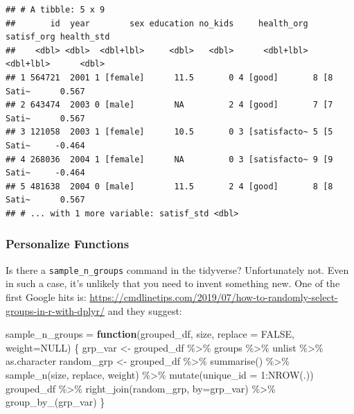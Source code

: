 \documentclass[
]{book}
\newenvironment{Shaded}{\begin{snugshade}}{\end{snugshade}}
\newcommand{\AttributeTok}[1]{\textcolor[rgb]{0.77,0.63,0.00}{#1}}
\newcommand{\ConstantTok}[1]{\textcolor[rgb]{0.00,0.00,0.00}{#1}}
\newcommand{\ControlFlowTok}[1]{\textcolor[rgb]{0.13,0.29,0.53}{\textbf{#1}}}
\newcommand{\DecValTok}[1]{\textcolor[rgb]{0.00,0.00,0.81}{#1}}
\newcommand{\FunctionTok}[1]{\textcolor[rgb]{0.00,0.00,0.00}{#1}}
\newcommand{\NormalTok}[1]{#1}
\newcommand{\OtherTok}[1]{\textcolor[rgb]{0.56,0.35,0.01}{#1}}
\newcommand{\SpecialCharTok}[1]{\textcolor[rgb]{0.00,0.00,0.00}{#1}}
\begin{document}
\begin{verbatim}
## # A tibble: 5 x 9
##       id  year        sex education no_kids     health_org satisf_org health_std
##    <dbl> <dbl>  <dbl+lbl>     <dbl>   <dbl>      <dbl+lbl>  <dbl+lbl>      <dbl>
## 1 564721  2001 1 [female]      11.5       0 4 [good]       8 [8 Sati~      0.567
## 2 643474  2003 0 [male]        NA         2 4 [good]       7 [7 Sati~      0.567
## 3 121058  2003 1 [female]      10.5       0 3 [satisfacto~ 5 [5 Sati~     -0.464
## 4 268036  2004 1 [female]      NA         0 3 [satisfacto~ 9 [9 Sati~     -0.464
## 5 481638  2004 0 [male]        11.5       2 4 [good]       8 [8 Sati~      0.567
## # ... with 1 more variable: satisf_std <dbl>
\end{verbatim}

\hypertarget{personalize-functions}{%
\subsubsection{Personalize Functions}\label{personalize-functions}}

Is there a \texttt{sample\_n\_groups} command in the tidyverse? Unfortunately not. Even in such a case, it's unlikely that you need to invent something new. One of the first Google hits is: \url{https://cmdlinetips.com/2019/07/how-to-randomly-select-groups-in-r-with-dplyr/} and they suggest:

\begin{Shaded}
\begin{Highlighting}[]
\NormalTok{sample\_n\_groups }\OtherTok{=} \ControlFlowTok{function}\NormalTok{(grouped\_df, size, }\AttributeTok{replace =} \ConstantTok{FALSE}\NormalTok{, }\AttributeTok{weight=}\ConstantTok{NULL}\NormalTok{) \{}
\NormalTok{  grp\_var }\OtherTok{\textless{}{-}}\NormalTok{ grouped\_df }\SpecialCharTok{\%\textgreater{}\%} 
\NormalTok{    groups }\SpecialCharTok{\%\textgreater{}\%}
\NormalTok{    unlist }\SpecialCharTok{\%\textgreater{}\%} 
\NormalTok{    as.character}
\NormalTok{  random\_grp }\OtherTok{\textless{}{-}}\NormalTok{ grouped\_df }\SpecialCharTok{\%\textgreater{}\%} 
    \FunctionTok{summarise}\NormalTok{() }\SpecialCharTok{\%\textgreater{}\%} 
    \FunctionTok{sample\_n}\NormalTok{(size, replace, weight) }\SpecialCharTok{\%\textgreater{}\%} 
    \FunctionTok{mutate}\NormalTok{(}\AttributeTok{unique\_id =} \DecValTok{1}\SpecialCharTok{:}\FunctionTok{NROW}\NormalTok{(.))}
\NormalTok{  grouped\_df }\SpecialCharTok{\%\textgreater{}\%} 
    \FunctionTok{right\_join}\NormalTok{(random\_grp, }\AttributeTok{by=}\NormalTok{grp\_var) }\SpecialCharTok{\%\textgreater{}\%} 
    \FunctionTok{group\_by\_}\NormalTok{(grp\_var) }
\NormalTok{\}}
\end{Highlighting}
\end{Shaded}
\end{document}
